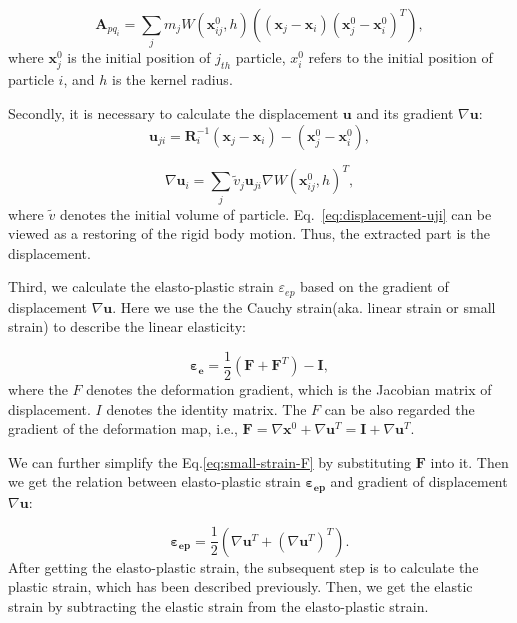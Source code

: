 \documentclass[10pt,journal,compsoc]{IEEEtran}
\begin{document}
\begin{equation}
	\mathbf{A}_{p q_i}=\sum_j m_j W\left(\mathbf{x}_{i j}^0, h\right)\left(\left(\mathbf{x}_j-\mathbf{x}_i\right)\left(\mathbf{x}_j^0-\mathbf{x}_i^0\right)^T\right), \label{eq:Apq}
\end{equation}
where $\mathbf{x}_j^0$ is the initial position of $j_{th}$ particle, $x_i^0$ refers to the initial position of particle $i$, and $h$ is the kernel radius.

Secondly, it is necessary to calculate the displacement $\mathbf{u}$ and its gradient $\nabla \mathbf{u}$:
\begin{equation}
	\mathbf{u}_{j i}=\mathbf{R}_i^{-1}\left(\mathbf{x}_j-\mathbf{x}_i\right)-\left(\mathbf{x}_j^0-\mathbf{x}_i^0\right), \label{eq:displacement-uji}
\end{equation}

\begin{equation}
	\nabla \mathbf{u}_i=\sum_j \tilde{v}_j \mathbf{u}_{j i} \nabla W\left(\mathbf{x}_{i j}^0, h\right)^T,
	\label{eq:displacement-gradient}
\end{equation}
where $\tilde{v}$ denotes the initial volume of particle. Eq.~\ref{eq:displacement-uji} can be viewed as a restoring of the rigid body motion. Thus, the extracted part is the displacement.

Third, we calculate the elasto-plastic strain {$\varepsilon_{ep}$} based on the gradient of displacement $\nabla \mathbf{u}$.  Here we use the the Cauchy strain(aka. linear strain or small strain) to describe the linear elasticity:

\begin{equation}
	\mathbf{\varepsilon_e} =\frac{1}{2}\left(\mathbf{F}+\mathbf{F}^T\right)-\mathbf{I}, \label{eq:small-strain-F}
\end{equation}
where the $F$ denotes the deformation gradient, which is the Jacobian matrix of displacement. $I$ denotes the identity matrix. The $F$ can be also regarded the gradient of the deformation map, i.e., $\mathbf{F}=\nabla \mathbf{x}^0+\nabla \mathbf{u}^T=\mathbf{I}+\nabla \mathbf{u}^T$.

We can further simplify the Eq.\ref{eq:small-strain-F} by substituting $\mathbf{F}$ into it. Then we get the relation between elasto-plastic strain $\mathbf{{ \varepsilon_{ep}}}$ and  gradient of displacement $\nabla \mathbf{u}$:

\begin{equation}
	\mathbf{ \varepsilon_{ep}} =\frac{1}{2}\left(\nabla \mathbf{u}^T+\left(\nabla \textbf{u}^T\right)^T\right). \label{eq:total-strain-eps-u-simple}
\end{equation}
After getting the elasto-plastic strain, the subsequent step is to calculate the plastic strain, which has been described previously. Then, we get the elastic strain by subtracting the elastic strain from the elasto-plastic strain.
\end{document}
